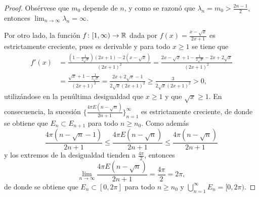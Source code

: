 \documentclass[a4paper, 12pt, oneside]{book}
\begin{document}
\begin{proof}
    Obsérvese que $m_0$ depende de $n$, y como se razonó que $\lambda_n = m_0 > \frac{2n-1}{2}$, entonces $\lim_{n\to\infty}\lambda_n = \infty$. 
    
    Por otro lado, la función $f \colon [1,\infty) \to \mathbb R$ dada por $f(x) = \frac{x-\sqrt{x}}{2x+1}$ es estrictamente creciente, pues es derivable y para todo $x \geq 1$ se tiene que
    \begin{align*}
        f'(x) &= \frac{(1-\frac{1}{2\sqrt{x}})(2x+1)-2(x-\sqrt{x})}{(2x+1)^2} = \frac{2x-\sqrt{x}+1-\frac{1}{2\sqrt{x}}-2x+2\sqrt{x}}{(2x+1)^2} \\
        &= \frac{\sqrt{x}+1-\frac{1}{2\sqrt{x}}}{(2x+1)^2} = \frac{2x+2\sqrt{x}-1}{2\sqrt{x}(2x+1)^2} \geq \frac{3}{2\sqrt{x}(2x+1)^2} > 0,
    \end{align*}
    utilizándose en la penúltima desigualdad que $x \geq 1$ y que $\sqrt{x}\geq 1$. En consecuencia, la sucesión $\{\frac{4\pi E(n-\sqrt{n})}{2n+1}\}_{n=1}^\infty$ es estrictamente creciente, de donde se obtiene que $E_n \subset E_{n+1}$ para todo $n \geq n_0$. Como además
    \[\frac{4\pi (n-\sqrt{n}-1)}{2n+1} \leq \frac{4\pi E(n-\sqrt{n})}{2n+1} \leq \frac{4\pi (n-\sqrt{n})}{2n+1} \]
    y los extremos de la desigualdad tienden a $\frac{4\pi}{2}$, entonces \[\lim_{n \to \infty}\frac{4\pi E(n-\sqrt{n})}{2n+1} = \frac{4\pi}{2} = 2\pi,\]
    de donde se obtiene que $E_n \subset [0,2\pi]$ para todo $n \geq n_0$ y $\bigcup_{n=1}^\infty E_n = [0,2\pi)$. 
    

\end{proof}
\end{document}

